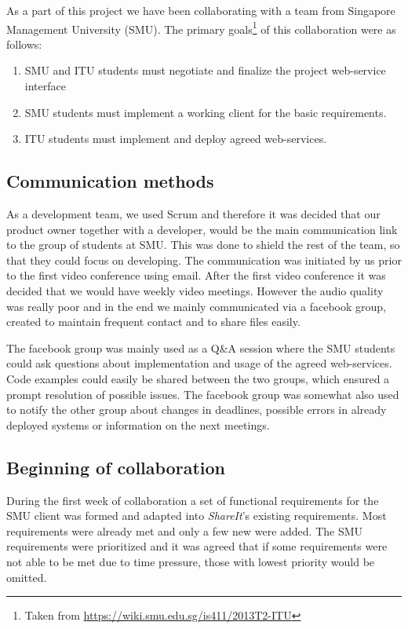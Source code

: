 \documentclass[../report.tex]{subfiles}
\begin{document}
\graphicspath{{img/}{../img/}}

As a part of this project we have been collaborating with a team from Singapore Management University (SMU). The primary goals\footnote{Taken from \url{https://wiki.smu.edu.sg/is411/2013T2-ITU}} of this collaboration were as follows:

\begin{enumerate}[label=\bfseries G\arabic*:]
\item SMU and ITU students must negotiate and finalize the project web-service interface
\item SMU students must implement a working client for the basic requirements.
\item ITU students must implement and deploy agreed web-services.
\end{enumerate}

\subsection{Communication methods}
As a development team, we used Scrum and therefore it was decided that our product owner together with a developer, would be the main communication link to the group of students at SMU.
This was done to shield the rest of the team, so that they could focus on developing.
The communication was initiated by us prior to the first video conference using email.
After the first video conference it was decided that we would have weekly video meetings.
However the audio quality was really poor and in the end we mainly communicated via a facebook group, created to maintain frequent contact and to share files easily.

The facebook group was mainly used as a Q\&A session where the SMU students could ask questions about implementation and usage of the agreed web-services. Code examples could easily be shared between the two groups, which ensured a prompt resolution of possible issues. The facebook group was somewhat also used to notify the other group about changes in deadlines, possible errors in already deployed systems or information on the next meetings.


\subsection{Beginning of collaboration}
During the first week of collaboration a set of functional requirements for the SMU client was formed and adapted into \textit{ShareIt}'s existing requirements. 
Most requirements were already met and only a few new were added. 
The SMU requirements were prioritized and it was agreed that if some requirements were not able to be met due to time pressure, those with lowest priority would be omitted.
\end{document}

